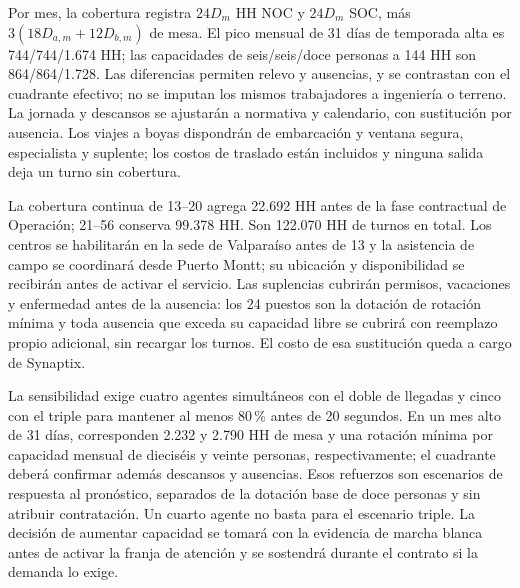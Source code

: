 Por mes, la cobertura registra $24D_m$ HH NOC y $24D_m$ SOC, más $3(18D_{a,m}+12D_{b,m})$ de mesa. El pico mensual de 31 días de temporada alta es 744/744/1.674 HH; las capacidades de seis/seis/doce personas a 144 HH son 864/864/1.728. Las diferencias permiten relevo y ausencias, y se contrastan con el cuadrante efectivo; no se imputan los mismos trabajadores a ingeniería o terreno. La jornada y descansos se ajustarán a normativa y calendario, con sustitución por ausencia. Los viajes a boyas dispondrán de embarcación y ventana segura, especialista y suplente; los costos de traslado están incluidos y ninguna salida deja un turno sin cobertura.

La cobertura continua de 13--20 agrega 22.692 HH antes de la fase contractual de Operación; 21--56 conserva 99.378 HH. Son 122.070 HH de turnos en total. Los centros se habilitarán en la sede de Valparaíso antes de 13 y la asistencia de campo se coordinará desde Puerto Montt; su ubicación y disponibilidad se recibirán antes de activar el servicio. Las suplencias cubrirán permisos, vacaciones y enfermedad antes de la ausencia: los 24 puestos son la dotación de rotación mínima y toda ausencia que exceda su capacidad libre se cubrirá con reemplazo propio adicional, sin recargar los turnos. El costo de esa sustitución queda a cargo de Synaptix.~\parencite[RT-21.01/03/05/16; pp.~35--38]{bases-transversales}

La sensibilidad exige cuatro agentes simultáneos con el doble de llegadas y cinco con el triple para mantener al menos 80\,\% antes de 20 segundos. En un mes alto de 31 días, corresponden 2.232 y 2.790 HH de mesa y una rotación mínima por capacidad mensual de dieciséis y veinte personas, respectivamente; el cuadrante deberá confirmar además descansos y ausencias. Esos refuerzos son escenarios de respuesta al pronóstico, separados de la dotación base de doce personas y sin atribuir contratación. Un cuarto agente no basta para el escenario triple. La decisión de aumentar capacidad se tomará con la evidencia de marcha blanca antes de activar la franja de atención y se sostendrá durante el contrato si la demanda lo exige.
